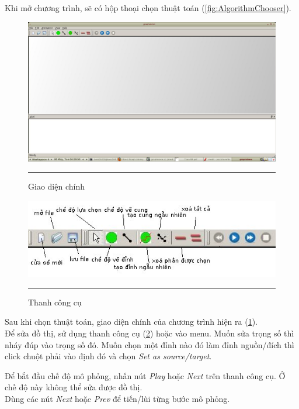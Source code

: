 \documentclass[a4paper,12pt]{report}
\begin{document}
    Khi mở chương trình, sẽ có hộp thoại chọn thuật toán
    (\ref{fig:AlgorithmChooser}).\\
\begin{figure}
    \centering
    \includegraphics[scale=0.3]{gd2}
    \rule{35em}{0.5pt}
    \caption{Giao diện chính}
    \label{fig:MainWindow}
\end{figure}

\begin{figure}
    \centering
    \includegraphics[scale=0.7]{gd3}
    \rule{35em}{0.5pt}
    \caption{Thanh công cụ}
    \label{fig:ToolBars}
\end{figure}

    Sau khi chọn thuật toán, giao diện chính của chương trình hiện ra
    (\ref{fig:MainWindow}).\\
    Để sửa đồ thị, sử dụng thanh công cụ (\ref{fig:ToolBars}) hoặc vào menu.
    Muốn sửa trọng số thì nháy đúp vào trọng số đó.
    Muốn chọn một đỉnh nào đó làm đỉnh nguồn/đích thì click chuột
    phải vào định đó và chọn \textit{Set as source/target}.

    Để bắt đầu chế độ mô phỏng, nhấn nút \textit{Play} hoặc \textit{Next} trên
    thanh công cụ. Ở chế độ này không thể sửa được đồ thị.\\
    Dùng các nút \textit{Next} hoặc \textit{Prev} để tiến/lùi từng bước mô
    phỏng.
\end{document}
